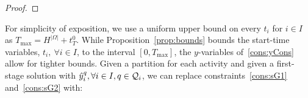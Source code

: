 \documentclass[11pt]{article}
\newcommand{\cQ}{{\cal Q}}
\newcommand{\noi}{\noindent}
\newcommand{\tcb}{\textcolor{blue}}
\begin{document}
{\begin{proof}
	\end{proof}}
	\noi For simplicity of exposition, we use a uniform upper bound on every \(t_i\) for \(i \in I\) as \(T_{\max} = H^{|\Omega|} + t_T^0\). While Proposition~\ref{prop:bounds} bounds the start-time variables, \(t_i,\ \forall i \in I\), to the interval \([0,T_{\max}]\),
	the $y$-variables of~\eqref{cons:yCons} allow for tighter bounds.   
	Given a partition for each activity and given a first-stage solution with \(\hat{y}_i^{q}, \forall i \in I, q \in \cQ_i \), we can replace 
	constraints~\eqref{cons:sG1} and~\eqref{cons:sG2} with:
\end{document}
